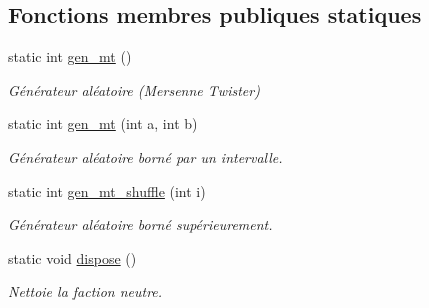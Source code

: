 \subsection*{Fonctions membres publiques statiques}
\begin{DoxyCompactItemize}
\item 
static int \hyperlink{classWorld_ae1a517e48a53300f77b9715f2d05da9f}{gen\-\_\-mt} ()
\begin{DoxyCompactList}\small\item\em Générateur aléatoire (Mersenne Twister) \end{DoxyCompactList}\item 
static int \hyperlink{classWorld_a5e407254abb3e35217524fe37f8a6a82}{gen\-\_\-mt} (int a, int b)
\begin{DoxyCompactList}\small\item\em Générateur aléatoire borné par un intervalle. \end{DoxyCompactList}\item 
static int \hyperlink{classWorld_aeeb9732117c1ed11efd98d17b1177e54}{gen\-\_\-mt\-\_\-shuffle} (int i)
\begin{DoxyCompactList}\small\item\em Générateur aléatoire borné supérieurement. \end{DoxyCompactList}\item 
\hypertarget{classWorld_abf19b18c7eb174377bf99b41aa84e769}{static void \hyperlink{classWorld_abf19b18c7eb174377bf99b41aa84e769}{dispose} ()}\label{classWorld_abf19b18c7eb174377bf99b41aa84e769}

\begin{DoxyCompactList}\small\item\em Nettoie la faction neutre. \end{DoxyCompactList}\end{DoxyCompactItemize}
